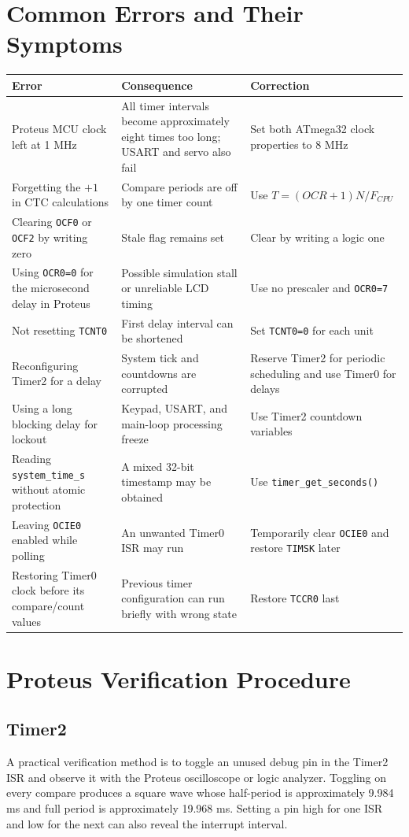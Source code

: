 \documentclass[11pt,a4paper]{article}
\begin{document}
\section{Common Errors and Their Symptoms}
\begin{longtable}{p{}p{}p{}}
\toprule
Error & Consequence & Correction \\
\midrule
Proteus MCU clock left at 1 MHz & All timer intervals become approximately eight times too long; USART and servo also fail & Set both ATmega32 clock properties to 8 MHz \\
Forgetting the \(+1\) in CTC calculations & Compare periods are off by one timer count & Use \(T=(OCR+1)N/F_{CPU}\) \\
Clearing \texttt{OCF0} or \texttt{OCF2} by writing zero & Stale flag remains set & Clear by writing a logic one \\
Using \texttt{OCR0=0} for the microsecond delay in Proteus & Possible simulation stall or unreliable LCD timing & Use no prescaler and \texttt{OCR0=7} \\
Not resetting \texttt{TCNT0} & First delay interval can be shortened & Set \texttt{TCNT0=0} for each unit \\
Reconfiguring Timer2 for a delay & System tick and countdowns are corrupted & Reserve Timer2 for periodic scheduling and use Timer0 for delays \\
Using a long blocking delay for lockout & Keypad, USART, and main-loop processing freeze & Use Timer2 countdown variables \\
Reading \texttt{system\_time\_s} without atomic protection & A mixed 32-bit timestamp may be obtained & Use \texttt{timer\_get\_seconds()} \\
Leaving \texttt{OCIE0} enabled while polling & An unwanted Timer0 ISR may run & Temporarily clear \texttt{OCIE0} and restore \texttt{TIMSK} later \\
Restoring Timer0 clock before its compare/count values & Previous timer configuration can run briefly with wrong state & Restore \texttt{TCCR0} last \\
\bottomrule
\end{longtable}

\section{Proteus Verification Procedure}
\subsection{Timer2}
A practical verification method is to toggle an unused debug pin in the Timer2 ISR and observe it with the Proteus oscilloscope or logic analyzer. Toggling on every compare produces a square wave whose half-period is approximately 9.984 ms and full period is approximately 19.968 ms. Setting a pin high for one ISR and low for the next can also reveal the interrupt interval.
\end{document}
